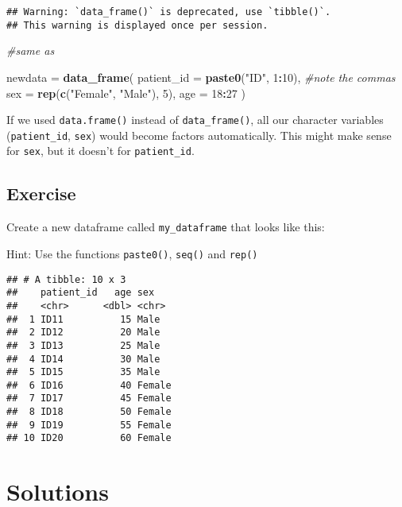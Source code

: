 \documentclass[]{book}
\makeatletter
\newenvironment{Shaded}{\begin{snugshade}}{\end{snugshade}}
\newcommand{\KeywordTok}[1]{\textcolor[rgb]{0.13,0.29,0.53}{\textbf{#1}}}
\newcommand{\DataTypeTok}[1]{\textcolor[rgb]{0.13,0.29,0.53}{#1}}
\newcommand{\DecValTok}[1]{\textcolor[rgb]{0.00,0.00,0.81}{#1}}
\newcommand{\StringTok}[1]{\textcolor[rgb]{0.31,0.60,0.02}{#1}}
\newcommand{\CommentTok}[1]{\textcolor[rgb]{0.56,0.35,0.01}{\textit{#1}}}
\newcommand{\OperatorTok}[1]{\textcolor[rgb]{0.81,0.36,0.00}{\textbf{#1}}}
\newcommand{\NormalTok}[1]{#1}
\newenvironment{kframe}{%
\medskip{}
\setlength{\fboxsep}{.8em}
 \def\at@end@of@kframe{}%
 \ifinner\ifhmode%
  \def\at@end@of@kframe{\end{minipage}}%
  \begin{minipage}{\columnwidth}%
 \fi\fi%
 \def\FrameCommand##1{\hskip\@totalleftmargin \hskip-\fboxsep
 \colorbox{shadecolor}{##1}\hskip-\fboxsep
     \hskip-\linewidth \hskip-\@totalleftmargin \hskip\columnwidth}%
 \MakeFramed {\advance\hsize-\width
   \@totalleftmargin\z@ \linewidth\hsize
   \@setminipage}}%
 {\par\unskip\endMakeFramed%
 \at@end@of@kframe}
\renewenvironment{Shaded}{\begin{kframe}}{\end{kframe}}
\theoremstyle{definition}
\theoremstyle{definition}
\theoremstyle{definition}
\theoremstyle{remark}
\makeatother
\begin{document}
\begin{verbatim}
## Warning: `data_frame()` is deprecated, use `tibble()`.
## This warning is displayed once per session.
\end{verbatim}

\begin{Shaded}
\begin{Highlighting}[]
\CommentTok{#same as}

\NormalTok{newdata      =}\StringTok{ }\KeywordTok{data_frame}\NormalTok{(}
  \DataTypeTok{patient_id =} \KeywordTok{paste0}\NormalTok{(}\StringTok{"ID"}\NormalTok{, }\DecValTok{1}\OperatorTok{:}\DecValTok{10}\NormalTok{), }\CommentTok{#note the commas}
  \DataTypeTok{sex        =} \KeywordTok{rep}\NormalTok{(}\KeywordTok{c}\NormalTok{(}\StringTok{"Female"}\NormalTok{, }\StringTok{"Male"}\NormalTok{), }\DecValTok{5}\NormalTok{),}
  \DataTypeTok{age        =} \DecValTok{18}\OperatorTok{:}\DecValTok{27}
\NormalTok{)}
\end{Highlighting}
\end{Shaded}

If we used \texttt{data.frame()} instead of \texttt{data\_frame()}, all
our character variables (\texttt{patient\_id}, \texttt{sex}) would
become factors automatically. This might make sense for \texttt{sex},
but it doesn't for \texttt{patient\_id}.

\subsection{Exercise}\label{exercise-15}

Create a new dataframe called \texttt{my\_dataframe} that looks like
this:

Hint: Use the functions \texttt{paste0()}, \texttt{seq()} and
\texttt{rep()}

\begin{verbatim}
## # A tibble: 10 x 3
##    patient_id   age sex   
##    <chr>      <dbl> <chr> 
##  1 ID11          15 Male  
##  2 ID12          20 Male  
##  3 ID13          25 Male  
##  4 ID14          30 Male  
##  5 ID15          35 Male  
##  6 ID16          40 Female
##  7 ID17          45 Female
##  8 ID18          50 Female
##  9 ID19          55 Female
## 10 ID20          60 Female
\end{verbatim}

\section{Solutions}\label{solutions-1}
\end{document}
